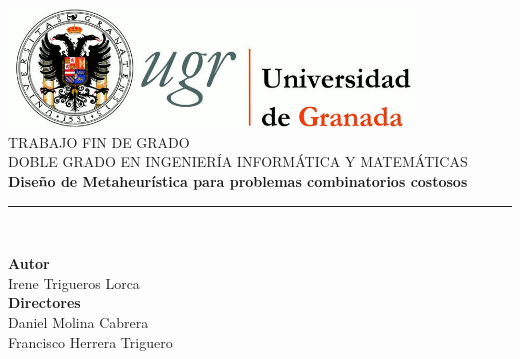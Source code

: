 \begin{titlepage}
 
 
\newlength{\centeroffset}
\setlength{\centeroffset}{-0.5\oddsidemargin}
\addtolength{\centeroffset}{0.5\evensidemargin}
\thispagestyle{empty}

\noindent\hspace*{\centeroffset}\begin{minipage}{\textwidth}

\centering
\includegraphics[width=0.8\textwidth]{imagenes/logo_ugr.jpg}\\[1.4cm]

\textsc{ \Large TRABAJO FIN DE GRADO\\[0.2cm]}
\textsc{ DOBLE GRADO EN INGENIERÍA INFORMÁTICA Y MATEMÁTICAS}\\[1cm]
% 
{\Huge\bfseries Diseño de Metaheurística para problemas combinatorios costosos\\
}
\noindent\rule[-1ex]{\textwidth}{3pt}\\[3.5ex]
\end{minipage}

\vspace{1cm}
\noindent\hspace*{\centeroffset}\begin{minipage}{\textwidth}
\centering

\textbf{Autor}\\ {Irene Trigueros Lorca}\\[2.5ex]
\textbf{Directores}\\
{Daniel Molina Cabrera\\
Francisco Herrera Triguero}\\[1cm]


\end{minipage}
\end{titlepage}
